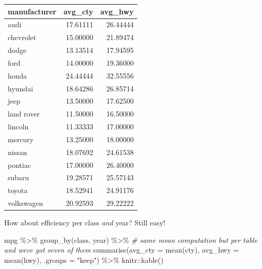 \documentclass[
]{book}
\newenvironment{Shaded}{\begin{snugshade}}{\end{snugshade}}
\newcommand{\AttributeTok}[1]{\textcolor[rgb]{0.77,0.63,0.00}{#1}}
\newcommand{\CommentTok}[1]{\textcolor[rgb]{0.56,0.35,0.01}{\textit{#1}}}
\newcommand{\FunctionTok}[1]{\textcolor[rgb]{0.00,0.00,0.00}{#1}}
\newcommand{\NormalTok}[1]{#1}
\newcommand{\SpecialCharTok}[1]{\textcolor[rgb]{0.00,0.00,0.00}{#1}}
\newcommand{\StringTok}[1]{\textcolor[rgb]{0.31,0.60,0.02}{#1}}
\begin{document}
\begin{tabular}{l|r|r}
\hline
manufacturer & avg\_cty & avg\_hwy\\
\hline
audi & 17.61111 & 26.44444\\
\hline
chevrolet & 15.00000 & 21.89474\\
\hline
dodge & 13.13514 & 17.94595\\
\hline
ford & 14.00000 & 19.36000\\
\hline
honda & 24.44444 & 32.55556\\
\hline
hyundai & 18.64286 & 26.85714\\
\hline
jeep & 13.50000 & 17.62500\\
\hline
land rover & 11.50000 & 16.50000\\
\hline
lincoln & 11.33333 & 17.00000\\
\hline
mercury & 13.25000 & 18.00000\\
\hline
nissan & 18.07692 & 24.61538\\
\hline
pontiac & 17.00000 & 26.40000\\
\hline
subaru & 19.28571 & 25.57143\\
\hline
toyota & 18.52941 & 24.91176\\
\hline
volkswagen & 20.92593 & 29.22222\\
\hline
\end{tabular}

How about efficiency per class \emph{and} year? Still easy!

\begin{Shaded}
\begin{Highlighting}[]
\NormalTok{mpg }\SpecialCharTok{\%\textgreater{}\%}
  \FunctionTok{group\_by}\NormalTok{(class, year)  }\SpecialCharTok{\%\textgreater{}\%}
  \CommentTok{\# same mean computation but per table and we\textquotesingle{}ve got seven of them}
  \FunctionTok{summarise}\NormalTok{(}\AttributeTok{avg\_cty =} \FunctionTok{mean}\NormalTok{(cty),}
            \AttributeTok{avg\_hwy =} \FunctionTok{mean}\NormalTok{(hwy), }\AttributeTok{.groups =} \StringTok{"keep"}\NormalTok{) }\SpecialCharTok{\%\textgreater{}\%}
\NormalTok{  knitr}\SpecialCharTok{::}\FunctionTok{kable}\NormalTok{()}
\end{Highlighting}
\end{Shaded}
\end{document}
